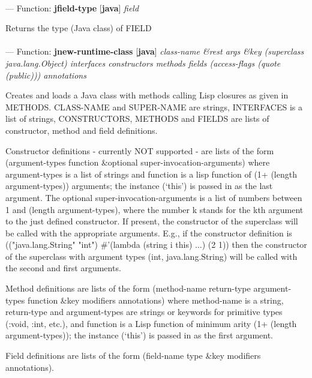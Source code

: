 \paragraph{}
\label{JAVA:JFIELD-TYPE}
--- Function: \textbf{jfield-type} [\textbf{java}] \textit{field}

\begin{adjustwidth}{5em}{5em}
Returns the type (Java class) of FIELD
\end{adjustwidth}

\paragraph{}
\label{JAVA:JNEW-RUNTIME-CLASS}
--- Function: \textbf{jnew-runtime-class} [\textbf{java}] \textit{class-name \&rest args \&key (superclass java.lang.Object) interfaces constructors methods fields (access-flags (quote (public))) annotations}

\begin{adjustwidth}{5em}{5em}
Creates and loads a Java class with methods calling Lisp closures
   as given in METHODS.  CLASS-NAME and SUPER-NAME are strings,
   INTERFACES is a list of strings, CONSTRUCTORS, METHODS and FIELDS are
   lists of constructor, method and field definitions.

   Constructor definitions - currently NOT supported - are lists of the form
   (argument-types function \&optional super-invocation-arguments)
   where argument-types is a list of strings and function is a lisp function of
   (1+ (length argument-types)) arguments; the instance (`this') is passed in as
   the last argument. The optional super-invocation-arguments is a list of numbers
   between 1 and (length argument-types), where the number k stands for the kth argument
   to the just defined constructor. If present, the constructor of the superclass
   will be called with the appropriate arguments. E.g., if the constructor definition is
   (("java.lang.String" "int") \#'(lambda (string i this) ...) (2 1))
   then the constructor of the superclass with argument types (int, java.lang.String) will
   be called with the second and first arguments.

   Method definitions are lists of the form
   (method-name return-type argument-types function \&key modifiers annotations)
   where method-name is a string, return-type and argument-types are strings or keywords for
   primitive types (:void, :int, etc.), and function is a Lisp function of minimum arity
   (1+ (length argument-types)); the instance (`this') is passed in as the first argument.

   Field definitions are lists of the form (field-name type \&key modifiers annotations).
\end{adjustwidth}

